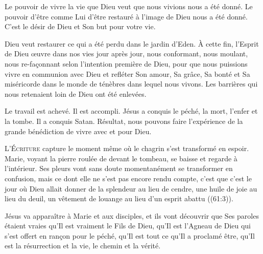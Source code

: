 Le pouvoir de vivre la vie que Dieu veut que nous vivions nous a été donné.
 Le pouvoir d'être comme Lui \ocadr d'être restauré à l'image de Dieu \fcadr{}
 nous a été donné. C'est le désir de Dieu et Son but pour votre vie.


Dieu veut restaurer ce qui a été perdu dans le jardin d'Eden.
 À cette fin, l'Esprit de Dieu \oe{}uvre dans nos vies jour après jour,
 nous conformant, nous moulant, nous re-fa\c{c}onnant selon l'intention
 première de Dieu, pour que nous puissions vivre en communion avec Dieu
 et refléter Son amour, Sa grâce, Sa bonté et Sa miséricorde
 dans le monde de ténèbres dans lequel nous vivons.
 Les barrières qui nous retenaient loin de Dieu ont été enlevées.

Le travail est achevé. Il est accompli. Jésus a conquis le péché,
 la mort, l'enfer et la tombe. Il a conquis Satan. Résultat,
 nous pouvons faire l'expérience de la grande bénédiction de vivre avec et pour Dieu.

\dvrule






\lettrine{L}{'Écriture} capture le moment même où le chagrin
 s'est transformé en espoir. Marie, voyant la pierre roulée
 de devant le tombeau, se baisse et regarde à l'intérieur.
 Ses pleurs vont sans doute momentanément se transformer en confusion,
 mais ce dont elle ne s'est pas encore rendu compte,
 c'est que c'est le jour où Dieu allait donner \Og de la splendeur
 au lieu de cendre, une huile de joie au lieu du deuil,
 un vêtement de louange au lieu d'un esprit abattu \Fg{}
 ((61:3)).


Jésus va apparaître à Marie et aux disciples, et ils vont découvrir
 que Ses paroles étaient vraies \ocadr qu'Il est vraiment le Fils de Dieu,
 qu'Il est l'Agneau de Dieu qui s'est offert en ran\c{c}on pour le péché,
 qu'Il est tout ce qu'Il a proclamé être, qu'Il est la résurrection et la vie,
 le chemin et la vérité.

